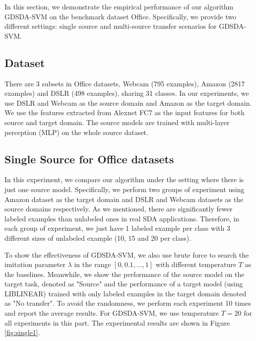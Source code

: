 In this section, we demonstrate the empirical performance of our algorithm GDSDA-SVM on the benchmark dataset Office. Specifically, we provide two different settings: single source and multi-source transfer scenarios for GDSDA-SVM.
\subsection{Dataset}
There are 3 subsets in Office datasets, Webcam (795 examples), Amazon (2817 examples) and DSLR (498 examples), sharing 31 classes. In our experiments, we use DSLR and Webcam as the source domain and Amazon as the target domain.
We use the features extracted from Alexnet \cite{KrizhevskyNIPS12} FC7 as the input features for both source and target domain. The source models are trained with multi-layer perception (MLP) on the whole source dataset. 

\subsection{Single Source for Office datasets}
In this experiment, we compare our algorithm under the setting where there is just one source model. Specifically, we perform two groups of experiment using Amazon dataset as the target domain and DSLR and Webcam datasets as the source domains respectively. As we mentioned, there are significantly fewer labeled examples than unlabeled ones in real SDA applications.
Therefore, in each group of experiment, we just have 1 labeled example per class with 3 different sizes of unlabeled example (10, 15 and 20 per class).

To show the effectiveness of GDSDA-SVM, we also use brute force to search the imitation parameter $\lambda$ in the range $[0,0.1,...,1]$ with different temperature $T$ as the baselines. Meanwhile, we show the performance of the source model on the target task, denoted as "Source" and the performance of a target model (using LIBLINEAR\cite{fan2008liblinear}) trained with only labeled examples in the target domain denoted as "No transfer". To avoid the randomness, we perform each experiment 10 times and report the average results. For GDSDA-SVM, we use temperature $T=20$ for all experiments in this part. The experimental results are shown in Figure \ref{fig:single1}. 

